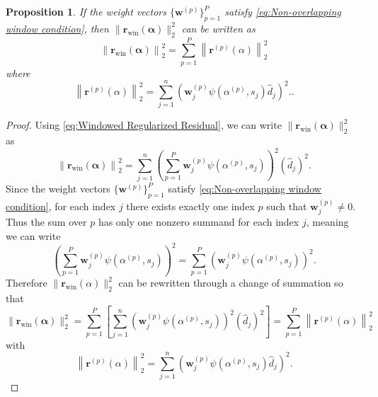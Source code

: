 \documentclass[12pt]{article}
\newcommand{\rVec}{\mathbf{r}}	%
\newcommand{\wVec}{\mathbf{w}}	%
\newcommand{\dft}[1]{\widehat{#1}}	%
\newcommand{\regparam}{\alpha}  %
\newcommand{\regparamVec}{\bm{\regparam}}   %
\newcommand{\mfilt}{\psi}
\newcommand{\singular}{s}	%
\newtheorem{proposition}{Proposition}[section]
\begin{document}
\begin{proposition}
\label{prop:Non-overlapping windows}
If the weight vectors $\{\wVec^{(p)}\}_{p=1}^{P}$ satisfy \eqref{eq:Non-overlapping window condition}, then $\|\rVec_{\text{win}}(\regparamVec)\|_2^2$ can be written as
\[\left\|\rVec_{\text{win}}(\regparamVec)\right\|_2^2 = \sum_{p=1}^{P} \left\|\rVec^{(p)}(\regparam)\right\|_2^2\]
where
\[\left\|\rVec^{(p)}(\regparam)\right\|_2^2 = \sum_{j=1}^{n} \left( \wVec_j^{(p)} \mfilt\left(\regparam^{(p)},\singular_j\right)\dft{d}_j\right)^2..\]
\end{proposition}
\begin{proof}
Using \eqref{eq:Windowed Regularized Residual}, we can write $\|\rVec_{\text{win}}(\regparamVec)\|_2^2$ as
\[\left\|\rVec_{\text{win}}(\regparamVec)\right\|_2^2 = \sum_{j=1}^{n} \left(\sum_{p=1}^{P} \wVec_j^{(p)} \mfilt\left(\regparam^{(p)},\singular_j\right) \right)^2 \left(\dft{d}_j\right)^2.\]
Since the weight vectors $\{\wVec^{(p)}\}_{p=1}^{P}$ satisfy \eqref{eq:Non-overlapping window condition}, for each index $j$ there exists exactly one index $p$ such that $\wVec^{(p)}_j \neq 0$. Thus the sum over $p$ has only one nonzero summand for each index $j$, meaning we can write
\[\left(\sum_{p=1}^{P} \wVec_j^{(p)} \mfilt\left(\regparam^{(p)},\singular_j\right) \right)^2 = \sum_{p=1}^{P} \left( \wVec_j^{(p)} \mfilt\left(\regparam^{(p)},\singular_j\right)\right)^2.\]
Therefore $\|\rVec_{\text{win}}(\regparam)\|_2^2$ can be rewritten through a change of summation so that
\[\|\rVec_{\text{win}}(\regparamVec)\|_2^2 = \sum_{p=1}^{P} \left[ \sum_{j=1}^{n} \left( \wVec_j^{(p)} \mfilt\left(\regparam^{(p)},\singular_j\right) \right)^2 \left(\dft{d}_j\right)^2\right] = \sum_{p=1}^{P} \left\|\rVec^{(p)}(\regparam)\right\|_2^2\]
with
\[\left\|\rVec^{(p)}(\regparam)\right\|_2^2 = \sum_{j=1}^{n} \left( \wVec_j^{(p)} \mfilt\left(\regparam^{(p)},\singular_j\right)\dft{d}_j\right)^2.\]
\end{proof}
\end{document}
